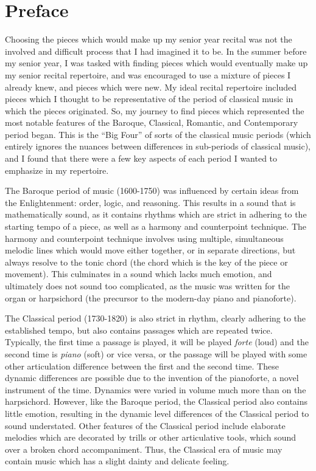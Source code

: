 \chapter*{Preface}\label{pref}

Choosing the pieces which would make up my senior year recital was not the involved and difficult process that I had imagined it to be. In the summer before my senior year, I was tasked with finding pieces which would eventually make up my senior recital repertoire, and was encouraged to use a mixture of pieces I already knew, and pieces which were new. My ideal recital repertoire included pieces which I thought to be representative of the period of classical music in which the pieces originated. So, my journey to find pieces which represented the most notable features of the Baroque, Classical, Romantic, and Contemporary period began. This is the ``Big Four'' of sorts of the classical music periods (which entirely ignores the nuances between differences in sub-periods of classical music), and I found that there were a few key aspects of each period I wanted to emphasize in my repertoire. 

The Baroque period of music (1600-1750) was influenced by certain ideas from the Enlightenment: order, logic, and reasoning. This results in a sound that is mathematically sound, as it contains rhythms which are strict in adhering to the starting tempo of a piece, as well as a harmony and counterpoint technique. The harmony and counterpoint technique involves using multiple, simultaneous melodic lines which would move either together, or in separate directions, but always resolve to the tonic chord (the chord which is the key of the piece or movement). This culminates in a sound which lacks much emotion, and ultimately does not sound too complicated, as the music was written for the organ or harpsichord (the precursor to the modern-day piano and pianoforte). 

The Classical period (1730-1820) is also strict in rhythm, clearly adhering to the established tempo, but also contains passages which are repeated twice. Typically, the first time a passage is played, it will be played \textit{forte} (loud) and the second time is \textit{piano} (soft) or vice versa, or the passage will be played with some other articulation difference between the first and the second time. These dynamic differences are possible due to the invention of the pianoforte, a novel instrument of the time. Dynamics were varied in volume much more than on the harpsichord. However, like the Baroque period, the Classical period also contains little emotion, resulting in the dynamic level differences of the Classical period to sound understated. Other features of the Classical period include elaborate melodies which are decorated by trills or other articulative tools, which sound over a broken chord accompaniment. Thus, the Classical era of music may contain music which has a slight dainty and delicate feeling.

